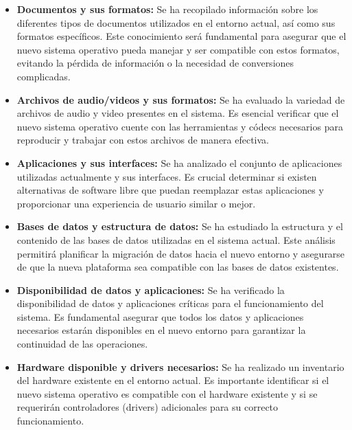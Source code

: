 		\begin{itemize}
			
			\item\textbf{Documentos y sus formatos:} Se ha recopilado información sobre los diferentes tipos de documentos utilizados en el entorno actual, así como sus formatos específicos. Este conocimiento será fundamental para asegurar que el nuevo sistema operativo pueda manejar y ser compatible con estos formatos, evitando la pérdida de información o la necesidad de conversiones complicadas.
		
			\item\textbf{Archivos de audio/videos y sus formatos:} Se ha evaluado la variedad de archivos de audio y video presentes en el sistema. Es esencial verificar que el nuevo sistema operativo cuente con las herramientas y códecs necesarios para reproducir y trabajar con estos archivos de manera efectiva.
		
			\item\textbf{Aplicaciones y sus interfaces:} Se ha analizado el conjunto de aplicaciones utilizadas actualmente y sus interfaces. Es crucial determinar si existen alternativas de software libre que puedan reemplazar estas aplicaciones y proporcionar una experiencia de usuario similar o mejor.
		
			\item\textbf{Bases de datos y estructura de datos:} Se ha estudiado la estructura y el contenido de las bases de datos utilizadas en el sistema actual. Este análisis permitirá planificar la migración de datos hacia el nuevo entorno y asegurarse de que la nueva plataforma sea compatible con las bases de datos existentes.
		
			\item\textbf{Disponibilidad de datos y aplicaciones:} Se ha verificado la disponibilidad de datos y aplicaciones críticas para el funcionamiento del sistema. Es fundamental asegurar que todos los datos y aplicaciones necesarios estarán disponibles en el nuevo entorno para garantizar la continuidad de las operaciones.
		
			\item\textbf{Hardware disponible y drivers necesarios:} Se ha realizado un inventario del hardware existente en el entorno actual. Es importante identificar si el nuevo sistema operativo es compatible con el hardware existente y si se requerirán controladores (drivers) adicionales para su correcto funcionamiento.
		
		\end{itemize}

